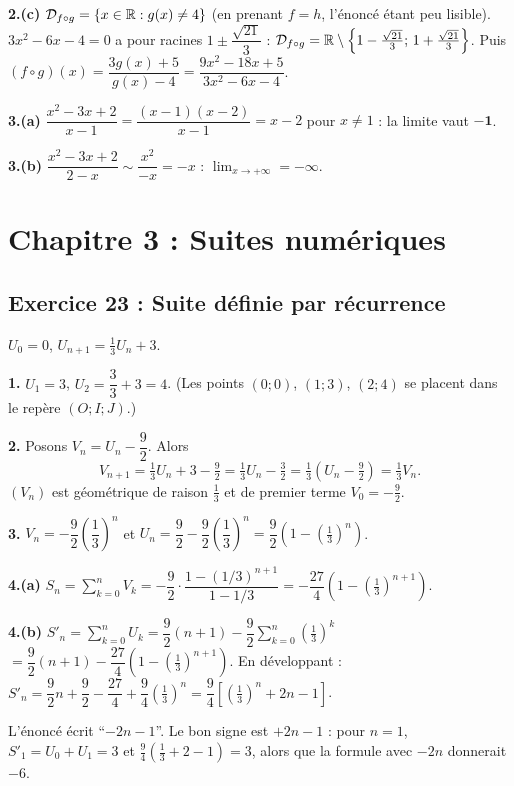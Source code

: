 \textbf{2.(c)} $\mathcal D_{f\circ g}=\{x\in\mathbb{R} : g(x)\neq4\}$ (en prenant $f=h$, l'\'enonc\'e \'etant peu lisible).
$3x^2-6x-4=0$ a pour racines $1\pm\dfrac{\sqrt{21}}{3}$ :
$\mathcal D_{f\circ g}=\mathbb{R}\setminus\left\{1-\tfrac{\sqrt{21}}{3};\,1+\tfrac{\sqrt{21}}{3}\right\}$.
Puis $(f\circ g)(x)=\dfrac{3g(x)+5}{g(x)-4}=\dfrac{9x^2-18x+5}{3x^2-6x-4}$.

\textbf{3.(a)} $\dfrac{x^2-3x+2}{x-1}=\dfrac{(x-1)(x-2)}{x-1}=x-2$ pour $x\neq1$ : la limite vaut $\mathbf{-1}$.

\textbf{3.(b)} $\dfrac{x^2-3x+2}{2-x}\sim\dfrac{x^2}{-x}=-x$ : $\lim_{x\to+\infty}=\mathbf{-\infty}$.

\section{Chapitre 3 : Suites num\'eriques}

\subsection{Exercice 23 : Suite d\'efinie par r\'ecurrence}

$U_0=0$, $U_{n+1}=\frac13U_n+3$.

\textbf{1.} $U_1=3$, $U_2=\dfrac{3}{3}+3=4$. (Les points $(0;0)$, $(1;3)$, $(2;4)$ se placent dans le rep\`ere $(O;I;J)$.)

\textbf{2.} Posons $V_n=U_n-\dfrac92$. Alors
\[
V_{n+1}=\tfrac13U_n+3-\tfrac92=\tfrac13U_n-\tfrac32=\tfrac13\left(U_n-\tfrac92\right)=\tfrac13V_n.
\]
$(V_n)$ est g\'eom\'etrique de raison $\frac13$ et de premier terme $V_0=-\frac92$.

\textbf{3.} $V_n=-\dfrac92\left(\dfrac13\right)^n$ et $U_n=\dfrac92-\dfrac92\left(\dfrac13\right)^n=\dfrac92\left(1-\left(\tfrac13\right)^n\right)$.

\textbf{4.(a)} $S_n=\sum_{k=0}^nV_k=-\dfrac92\cdot\dfrac{1-(1/3)^{n+1}}{1-1/3}=-\dfrac{27}{4}\left(1-\left(\tfrac13\right)^{n+1}\right)$.

\textbf{4.(b)} $S'_n=\sum_{k=0}^nU_k=\dfrac92(n+1)-\dfrac92\sum_{k=0}^n\left(\tfrac13\right)^k$
$=\dfrac92(n+1)-\dfrac{27}{4}\left(1-\left(\tfrac13\right)^{n+1}\right)$.
En d\'eveloppant : $S'_n=\dfrac92n+\dfrac92-\dfrac{27}{4}+\dfrac{9}{4}\left(\tfrac13\right)^n=\dfrac94\left[\left(\tfrac13\right)^n+2n-1\right]$.
\begin{rem} L'\'enonc\'e \'ecrit ``$-2n-1$''. Le bon signe est $+2n-1$ : pour $n=1$, $S'_1=U_0+U_1=3$ et
$\frac94\left(\frac13+2-1\right)=3$, alors que la formule avec $-2n$ donnerait $-6$.\end{rem}

